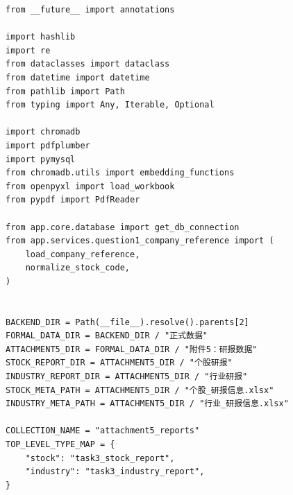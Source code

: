 \documentclass[withoutpreface,bwprint]{cumcmthesis} %
\begin{document}
\begin{appendices}
	\begin{lstlisting}[caption={部分核心代码}, label={lst:code1}]
	from __future__ import annotations

import hashlib
import re
from dataclasses import dataclass
from datetime import datetime
from pathlib import Path
from typing import Any, Iterable, Optional

import chromadb
import pdfplumber
import pymysql
from chromadb.utils import embedding_functions
from openpyxl import load_workbook
from pypdf import PdfReader

from app.core.database import get_db_connection
from app.services.question1_company_reference import (
    load_company_reference,
    normalize_stock_code,
)


BACKEND_DIR = Path(__file__).resolve().parents[2]
FORMAL_DATA_DIR = BACKEND_DIR / "正式数据"
ATTACHMENT5_DIR = FORMAL_DATA_DIR / "附件5：研报数据"
STOCK_REPORT_DIR = ATTACHMENT5_DIR / "个股研报"
INDUSTRY_REPORT_DIR = ATTACHMENT5_DIR / "行业研报"
STOCK_META_PATH = ATTACHMENT5_DIR / "个股_研报信息.xlsx"
INDUSTRY_META_PATH = ATTACHMENT5_DIR / "行业_研报信息.xlsx"

COLLECTION_NAME = "attachment5_reports"
TOP_LEVEL_TYPE_MAP = {
    "stock": "task3_stock_report",
    "industry": "task3_industry_report",
}
\end{lstlisting}
\end{appendices}
\end{document}
